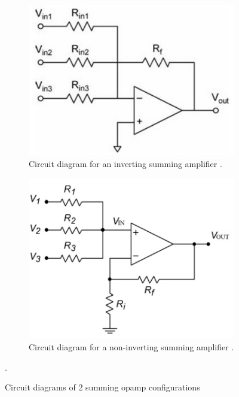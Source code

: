 \begin{figure}[H]
\footnotesize
\centering
\begin{subfigure}[]{0.35\textwidth}
\includegraphics[width=\linewidth]{./Figures/DAC_InvAmp.png}
\caption{Circuit diagram for an inverting summing amplifier \cite{Lit_SumAmp}.}
\label{subfig:inv_sum_amp}	
\end{subfigure}
\begin{subfigure}[]{0.35\textwidth}
\includegraphics[width=\linewidth]{./Figures/DAC_NonInvAmp.png}
\caption{Circuit diagram for a non-inverting summing amplifier \cite{Lit_SumAmp}.}
\label{subfig:noninv_sum_amp}	
\end{subfigure}
\caption {Circuit diagrams of 2 summing opamp configurations}.
\label{fig:sum_circuit_diagram}
\end{figure}
